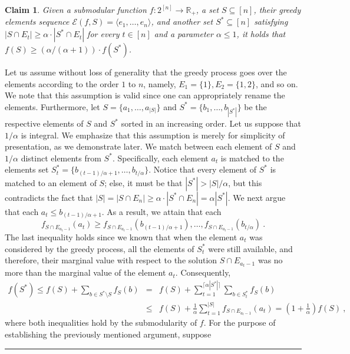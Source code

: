 \documentclass[11pt]{article}
\theoremstyle{plain}
\newtheorem{claim}[theorem]{Claim}
\theoremstyle{definition}
\newcommand{\qedsymb}{\hfill{\rule{2mm}{2mm}}}
\renewenvironment{proof}{\begin{trivlist} \item[\hspace{\labelsep}{\bf \noindent Proof.\/}] }{\qedsymb\end{trivlist}}\newenvironment{proofof}[1]{\begin{trivlist} \item[\hspace{\labelsep}{\bf \noindent Proof of #1.\/}] }{\qedsymb\end{trivlist}}\newenvironment{MyEqn}[1]{\setlength\arraycolsep{2pt}\begin{eqnarray*} #1}{\end{eqnarray*}}
\newcommand{\bbR}{\mathbb{R}}
\begin{document}
\begin{claim} \label{claim:SparseGreedyBound}
Given a submodular function $f: 2^{[n]} \to \bbR_+$, a set $S
\subseteq [n]$, their greedy elements sequence $\mathcal{E}(f,S) =
\langle e_1, \ldots, e_n \rangle$, and another set $S^* \subseteq
[n]$ satisfying $|S \cap E_t| \geq \alpha \cdot |S^* \cap E_t|$
for every $t \in [n]$ and a parameter $\alpha \leq 1$, it holds
that $f(S) \geq (\alpha / (\alpha+1)) \cdot f(S^*)$.
\end{claim}
\begin{proof}
Let us assume without loss of generality that the greedy process
goes over the elements according to the order $1$ to $n$, namely,
$E_1 = \{1\}, E_2 = \{1,2\}$, and so on. We note that this
assumption is valid since one can appropriately rename the
elements. Furthermore, let $S = \{a_1,\ldots,a_{|S|}\}$ and $S^* =
\{b_1,\ldots,b_{|S^*|}\}$ be the respective elements of $S$ and
$S^*$ sorted in an increasing order. Let us suppose that
$1/\alpha$ is integral. We emphasize that this assumption is
merely for simplicity of presentation, as we demonstrate later. We
match between each element of $S$ and $1/\alpha$ distinct elements
from $S^*$. Specifically, each element $a_t$ is matched to the
elements set $S^*_t = \{b_{(t-1)/\alpha+1},\ldots,b_{t/\alpha}\}$.
Notice that every element of $S^*$ is matched to an element of
$S$; else, it must be that $|S^*| > |S|/\alpha$, but this
contradicts the fact that $|S| = |S \cap E_n| \geq \alpha \cdot
|S^* \cap E_n| = \alpha |S^*|$. We next argue that each $a_t \leq
b_{(t-1)/\alpha+1}$. As a result, we attain that each
$$
f_{S \cap E_{a_t-1}}(a_t) \geq f_{S \cap
E_{a_t-1}}(b_{(t-1)/\alpha+1}), \ldots, f_{S \cap
E_{a_t-1}}(b_{t/\alpha}) \ .
$$
The last inequality holds since we known that when the element
$a_t$ was considered by the greedy process, all the elements of
$S^*_t$ were still available, and therefore, their marginal value
with respect to the solution $S \cap E_{a_t-1}$ was no more than
the marginal value of the element $a_t$. Consequently,
\begin{eqnarray*}
f(S^*) \leq f(S) + \sum_{b \in S^* \setminus S} f_S(b) & = & f(S)
+ \sum_{t = 1}^{\lceil \alpha |S^*| \rceil} \sum_{b \in S^*_t} f_S(b)\\
& \leq & f(S) + \frac{1}{\alpha} \sum_{t = 1}^{|S|} f_{S \cap
E_{a_t-1}}(a_t) = \left(1+\frac{1}{\alpha}\right) f(S) \ ,
\end{eqnarray*}
where both inequalities hold by the submodularity of $f$. For the
purpose of establishing the previously mentioned argument, suppose

\end{proof}
\end{document}

